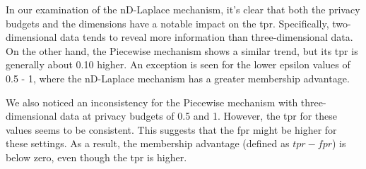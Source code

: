 In our examination of the nD-Laplace mechanism, it's clear that both the privacy budgets and the dimensions have a notable impact on the \gls{tpr}. Specifically, two-dimensional data tends to reveal more information than three-dimensional data. On the other hand, the Piecewise mechanism shows a similar trend, but its \gls{tpr} is generally about 0.10 higher. An exception is seen for the lower epsilon values of 0.5 - 1, where the nD-Laplace mechanism has a greater membership advantage.

We also noticed an inconsistency for the Piecewise mechanism with three-dimensional data at privacy budgets of 0.5 and 1. However, the \gls{tpr} for these values seems to be consistent. This suggests that the \gls{fpr} might be higher for these settings. As a result, the membership advantage (defined as $tpr - fpr$) is below zero, even though the \gls{tpr} is higher.
\newpage
